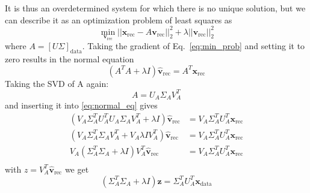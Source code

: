 \documentclass[a4paper]{article}
\begin{document}
It is thus an overdetermined system for which there is no unique solution, but we can describe it as an optimization problem of least squares as
\begin{equation} \label{eq:min_prob}
    \min_{\mathbf{v}_\mathrm{rec}}    ||\mathbf{x}_\mathrm{rec}- A \mathbf{v}_\mathrm{rec}||_2^2 + \lambda ||\mathbf{v}_\mathrm{rec}||_2^2
\end{equation}
where $A=[U \Sigma]_\mathrm{data}$. Taking the gradient of Eq.~\eqref{eq:min_prob} and setting it to zero results in the normal equation
\begin{equation} \label{eq:normal_eq}
    (A^TA+\lambda I)\hat{\mathbf{v}}_\mathrm{rec} = A^T \mathbf{x}_\mathrm{rec}
\end{equation}
Taking the SVD of A again:
\begin{equation}
    A = U_A \Sigma_A V_A^T
\end{equation}
and inserting it into \eqref{eq:normal_eq} gives
\begin{align}
    (V_A\Sigma_A^T U_A^T U_A \Sigma_A V_A^T + \lambda I)\hat{\mathbf{v}}_\mathrm{rec} &= V_A\Sigma_A^T U_A^T \mathbf{x}_\mathrm{rec}\\
    \label{eq:unitary}
    (V_A\Sigma_A^T \Sigma_A V_A^T + V_A \lambda I V_A^T)\hat{\mathbf{v}}_\mathrm{rec} &= V_A\Sigma_A^T U_A^T \mathbf{x}_\mathrm{rec}\\
    V_A(\Sigma_A^T \Sigma_A + \lambda I) V_A^T \hat{\mathbf{v}}_\mathrm{rec} &= V_A\Sigma_A^T U_A^T \mathbf{x}_\mathrm{rec}\\
\end{align}
with $z = V_A^T \hat{\mathbf{v}}_\mathrm{rec}$ we get
\begin{equation}
    (\Sigma_A^T \Sigma_A + \lambda I) \mathbf{z} = \Sigma_A^T U_A^T \mathbf{x}_\mathrm{data}
\end{equation}
\end{document}
